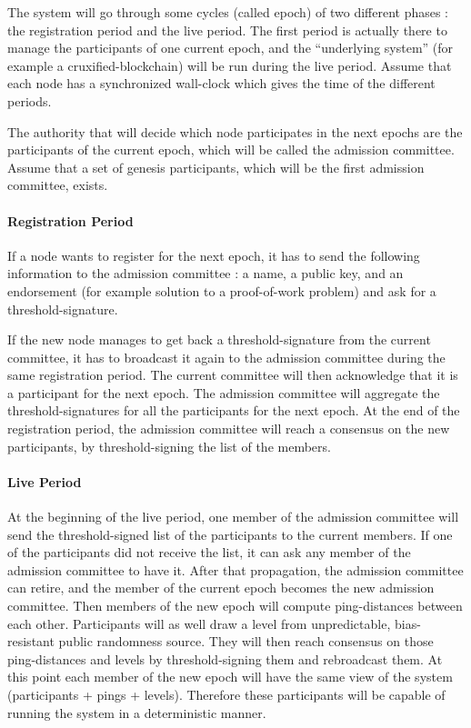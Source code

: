 \documentclass[a4paper,11pt,oneside]{report}
\begin{document}
The system will go through some cycles (called epoch) of two different phases :
the registration period and the live period. The first period is actually there
to manage the participants of one current epoch, and the “underlying system”
(for example a cruxified-blockchain) will be run during the live period. Assume
that each node has a synchronized wall-clock which gives the time of the
different periods.

The authority that will decide which node participates in the next epochs are
the participants of the current epoch, which will be called the admission
committee. Assume that a set of genesis participants, which will be the first
admission committee, exists.

\paragraph{Registration Period}
If a node wants to register for the next epoch, it has to send the following
information to the admission committee : a name, a public key, and an
endorsement (for example solution to a proof-of-work problem) and ask for a
threshold-signature. 

If the new node manages to get back a threshold-signature from the current
committee, it has to broadcast it again to the admission committee during the
same registration period. The current committee will then acknowledge that it
is a participant for the next epoch. The admission committee will aggregate the
threshold-signatures for all the participants for the next epoch. At the end of
the registration period, the admission committee will reach a consensus on the
new participants, by threshold-signing the list of the members.  

\paragraph{Live Period}
At the beginning of the live period, one member of the admission committee will
send the threshold-signed list of the participants to the current members. If
one of the participants did not receive the list, it can ask any member of the
admission committee to have it. After that propagation, the admission committee
can retire, and the member of the current epoch becomes the new admission
committee. Then members of the new epoch will compute ping-distances between
each other. Participants will as well draw a level from unpredictable,
bias-resistant public randomness source. They will then reach consensus on
those ping-distances and levels by threshold-signing them and rebroadcast them.
At this point each member of the new epoch will have the same view of the
system (participants + pings + levels). Therefore these participants will be
capable of running the system in a deterministic manner.
\end{document}
